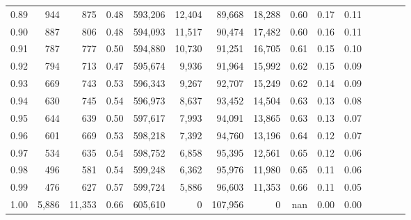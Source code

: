 \begin{tabular}{rrrcrrrrrrrrrrr}
0.89 &     944 &     875 &                                       0.48 &  593,206 &   12,404 &   89,668 &   18,288 &  0.60 &  0.17 &                         0.11 \\
0.90 &     887 &     806 &                                       0.48 &  594,093 &   11,517 &   90,474 &   17,482 &  0.60 &  0.16 &                         0.11 \\
0.91 &     787 &     777 &                                       0.50 &  594,880 &   10,730 &   91,251 &   16,705 &  0.61 &  0.15 &                         0.10 \\
0.92 &     794 &     713 &                                       0.47 &  595,674 &    9,936 &   91,964 &   15,992 &  0.62 &  0.15 &                         0.09 \\
0.93 &     669 &     743 &                                       0.53 &  596,343 &    9,267 &   92,707 &   15,249 &  0.62 &  0.14 &                         0.09 \\
0.94 &     630 &     745 &                                       0.54 &  596,973 &    8,637 &   93,452 &   14,504 &  0.63 &  0.13 &                         0.08 \\
0.95 &     644 &     639 &                                       0.50 &  597,617 &    7,993 &   94,091 &   13,865 &  0.63 &  0.13 &                         0.07 \\
0.96 &     601 &     669 &                                       0.53 &  598,218 &    7,392 &   94,760 &   13,196 &  0.64 &  0.12 &                         0.07 \\
0.97 &     534 &     635 &                                       0.54 &  598,752 &    6,858 &   95,395 &   12,561 &  0.65 &  0.12 &                         0.06 \\
0.98 &     496 &     581 &                                       0.54 &  599,248 &    6,362 &   95,976 &   11,980 &  0.65 &  0.11 &                         0.06 \\
0.99 &     476 &     627 &                                       0.57 &  599,724 &    5,886 &   96,603 &   11,353 &  0.66 &  0.11 &                         0.05 \\
1.00 &   5,886 &  11,353 &                                       0.66 &  605,610 &        0 &  107,956 &        0 &   nan &  0.00 &                         0.00 \\
\bottomrule
\end{tabular}

